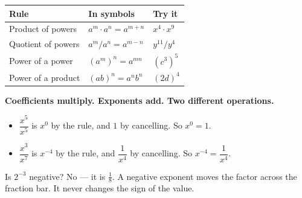 \documentclass[aspectratio=169, 11pt]{beamer}
\begin{document}
\begin{frame}[t, plain]
  \renewcommand{\arraystretch}{1.6}
  \begin{tabularx}{\textwidth}{@{}p{4.2cm} p{4.4cm} X@{}}
    \textbf{Rule} & \textbf{In symbols} & \textbf{Try it} \\
    \hline
    Product of powers   & $a^m \cdot a^n = a^{m+n}$      & $x^4 \cdot x^9$ \\
    Quotient of powers  & $a^m / a^n = a^{m-n}$          & $y^{11}/y^4$ \\
    Power of a power    & $\left(a^m\right)^n = a^{mn}$  & $\left(c^3\right)^5$ \\
    Power of a product  & $(ab)^n = a^n b^n$             & $(2d)^4$ \\
  \end{tabularx}
  \vspace{0.4cm}

  {\color{royal}\bfseries Coefficients multiply. Exponents add. Two different operations.}
\end{frame}

\begin{frame}[t, plain]
  \begin{itemize}
    \setlength{\itemsep}{0.35cm}
    \item $\dfrac{x^5}{x^5}$ is $x^0$ by the rule, and $1$ by cancelling. So $x^0=1$.
    \item $\dfrac{x^3}{x^7}$ is $x^{-4}$ by the rule, and $\dfrac{1}{x^4}$ by cancelling.
          So $x^{-4}=\dfrac{1}{x^4}$.
  \end{itemize}
  \vspace{0.3cm}
  \begin{block}{Is $2^{-3}$ negative?}
    No --- it is $\tfrac18$. A negative exponent moves the factor across the fraction bar.
    It never changes the sign of the value.
  \end{block}
\end{frame}
\end{document}
